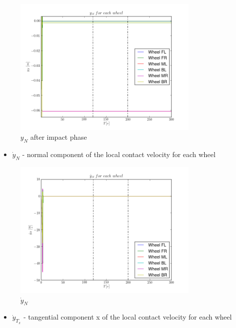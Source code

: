 \begin{figure}[H]
  \centering
    \includegraphics[width=0.8\textwidth]{yN5zoom}
  \caption{$y_N$ after impact phase}
\end{figure}

\begin{itemize}
  \item $\dot{y}_{N}$ - normal component of the local contact velocity for each wheel
\end{itemize}

\begin{figure}[H]
  \centering
    \includegraphics[width=0.8\textwidth]{yNdot5}
  \caption{$\dot{y}_{N}$}
\end{figure}

\begin{itemize}
  \item $\dot{y}_{T_x}$ - tangential component x of the local contact velocity for each wheel
\end{itemize}

